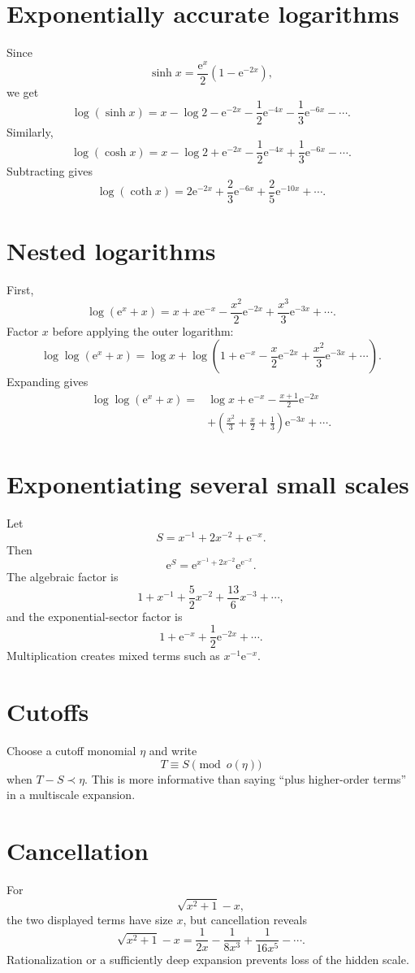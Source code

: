 \documentclass[11pt,oneside,openany]{book}
\newcommand{\e}{\mathrm{e}}
\theoremstyle{plain}
\theoremstyle{definition}
\theoremstyle{remark}
\begin{document}
\section{Exponentially accurate logarithms}
Since
\[
  \sinh x=\frac{\e^x}{2}(1-\e^{-2x}),
\]
we get
\[
\boxed{
  \log(\sinh x)=x-\log2-
  \e^{-2x}-\frac12\e^{-4x}-\frac13\e^{-6x}-\cdots.}
\]
Similarly,
\[
  \log(\cosh x)=x-\log2+
  \e^{-2x}-\frac12\e^{-4x}+\frac13\e^{-6x}-\cdots.
\]
Subtracting gives
\[
  \log(\coth x)=2\e^{-2x}+\frac23\e^{-6x}+\frac25\e^{-10x}+\cdots.
\]

\section{Nested logarithms}
\begin{worked}
First,
\[
  \log(\e^x+x)=x+x\e^{-x}-\frac{x^2}{2}\e^{-2x}
  +\frac{x^3}{3}\e^{-3x}+\cdots.
\]
Factor $x$ before applying the outer logarithm:
\[
  \log\log(\e^x+x)
  =\log x+\log\left(1+\e^{-x}-\frac{x}{2}\e^{-2x}
  +\frac{x^2}{3}\e^{-3x}+\cdots\right).
\]
Expanding gives
\[
\boxed{
\begin{aligned}
\log\log(\e^x+x)
={}&\log x+\e^{-x}-\frac{x+1}{2}\e^{-2x}\\
&+\left(\frac{x^2}{3}+\frac{x}{2}+\frac13\right)\e^{-3x}
+\cdots.
\end{aligned}}
\]
\end{worked}

\section{Exponentiating several small scales}
Let
\[
  S=x^{-1}+2x^{-2}+\e^{-x}.
\]
Then
\[
  \e^S=\e^{x^{-1}+2x^{-2}}\e^{\e^{-x}}.
\]
The algebraic factor is
\[
  1+x^{-1}+\frac52x^{-2}+\frac{13}{6}x^{-3}+\cdots,
\]
and the exponential-sector factor is
\[
  1+\e^{-x}+\frac12\e^{-2x}+\cdots.
\]
Multiplication creates mixed terms such as $x^{-1}\e^{-x}$.

\section{Cutoffs}
Choose a cutoff monomial $\eta$ and write
\[
  T\equiv S\pmod{o(\eta)}
\]
when $T-S\prec\eta$. This is more informative than saying ``plus higher-order terms'' in a multiscale expansion.

\section{Cancellation}
For
\[
  \sqrt{x^2+1}-x,
\]
the two displayed terms have size $x$, but cancellation reveals
\[
  \sqrt{x^2+1}-x
  =\frac1{2x}-\frac1{8x^3}+\frac1{16x^5}-\cdots.
\]
Rationalization or a sufficiently deep expansion prevents loss of the hidden scale.
\end{document}
